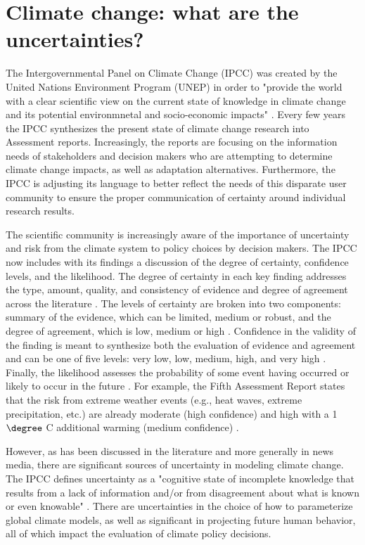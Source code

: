 \documentclass[10pt]{amsart}
\begin{document}
\section{Climate change: what are the uncertainties?}
The Intergovernmental Panel on Climate Change (IPCC) was created by the United Nations Environment Program (UNEP) in order to "provide the world with a clear scientific view on the current state of knowledge in climate change and its potential environmnetal and socio-economic impacts" \parencite[1]{ipcc2016organization}. 
Every few years the IPCC synthesizes the present state of climate change research into Assessment reports.
Increasingly, the reports are focusing on the information needs of stakeholders and decision makers who are attempting to determine climate change impacts, as well as adaptation alternatives.
Furthermore, the IPCC is adjusting its language to better reflect the needs of this disparate user community to ensure the proper communication of certainty around individual research results.

The scientific community is increasingly aware of the importance of uncertainty and risk from the climate system to policy choices by decision makers.
The IPCC now includes with its findings a discussion of the degree of certainty, confidence levels, and the likelihood.
The degree of certainty in each key finding addresses the type, amount, quality, and consistency of evidence and degree of agreement across the literature \parencite[6]{ipcc2016organization}.
The levels of certainty are broken into two components: summary of the evidence, which can be limited, medium or robust, and the degree of agreement, which is low, medium or high \parencite[6]{ipcc2016organization}.
Confidence in the validity of the finding is meant to synthesize both the evaluation of evidence and agreement and can be one of five levels: very low, low, medium, high, and very high \parencite[6]{ipcc2016organization}. 
Finally, the likelihood assesses the probability of some event having occurred or likely to occur in the future \parencite[6]{ipcc2016organization}.
For example, the Fifth Assessment Report states that the risk from extreme weather events (e.g., heat waves, extreme precipitation, etc.)  
are already moderate (high confidence) and high with a 1$\degree$ C additional warming (medium confidence) \parencite[6]{ipcc2016organization}.

However, as has been discussed in the literature and more generally in news media, there are significant sources of uncertainty in modeling climate change.
The IPCC defines uncertainty as a "cognitive state of incomplete knowledge that results from a lack of information and/or from disagreement about what is known or even knowable" \parencite{kunreuther2014integrated}.
There are uncertainties in the choice of how to parameterize global climate models, as well as significant in projecting future human behavior, all of which impact the evaluation of climate policy decisions.
\end{document}
